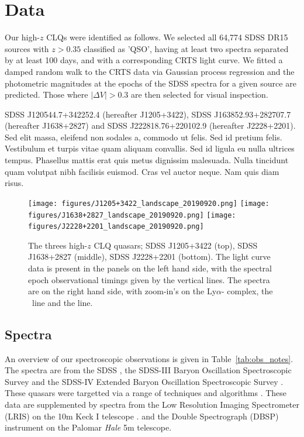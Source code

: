 \documentclass[a4paper,fleqn,usenatbib]{mnras}
\begin{document}
\section{Data}
Our high-$z$ CLQs were identified as follows. 
We selected all 64,774 SDSS DR15 sources with $z > 0.35$ classified as
'QSO', having at least two spectra separated by at least 100 days, and
with a corresponding CRTS light curve. We fitted a damped random walk
to the CRTS data via Gaussian process regression and the photometric
magnitudes at the epochs of the SDSS spectra for a given source are
predicted. Those where $|\Delta V| > 0.3$ are then selected for visual
inspection.

SDSS J120544.7+342252.4  (hereafter J1205+3422), 
SDSS J163852.93+282707.7 (hereafter J1638+2827) and
SDSS J222818.76+220102.9 (hereafter J2228+2201). 
Sed elit massa, eleifend non sodales a, commodo ut felis. Sed id
pretium felis. Vestibulum et turpis vitae quam aliquam convallis. Sed
id ligula eu nulla ultrices tempus. Phasellus mattis erat quis metus
dignissim malesuada. Nulla tincidunt quam volutpat nibh facilisis
euismod. Cras vel auctor neque. Nam quis diam risus.




\begin{figure}
  \centering
  \texttt{[image: figures/J1205+3422\_landscape\_20190920.png]}
  \texttt{[image: figures/J1638+2827\_landscape\_20190920.png]}
  \texttt{[image: figures/J2228+2201\_landscape\_20190920.png]}
  \vspace{-12pt}
  \caption[]{The threes high-$z$ CLQ quasars; 
    SDSS J1205+3422 (top), 
    SDSS J1638+2827 (middle), 
    SDSS J2228+2201 (bottom). 
The light curve data is present in the panels on the left hand side, with the 
spectral epoch observational timings given by the vertical lines. 
The spectra are on the right hand side, with zoom-in's on the Ly$\alpha$-\nv 
complex, the \civ\ line and the \mgii line. 
  }
  \label{fig:civ_clqs}
\end{figure}
\subsection{Spectra}
An overview of our spectroscopic observations is given in
Table~\ref{tab:obs_notes}.  The spectra are from the SDSS
\citep{Stoughton2002, DR7, Schneider2010}, the SDSS-III Baryon
Oscillation Spectroscopic Survey \citep[BOSS][]{Eisenstein2011,
Dawson2013, Smee2013, Alam2015, Paris2017} and the SDSS-IV Extended
Baryon Oscillation Spectroscopic Survey \citep[eBOSS; ][]{Dawson2016,
Abolfathi2018, Paris2018}.  These quasars were targetted via a range of
techniques and algorithms \citep[][]{Richards2002, Ross2012,
Myers2015}.  These data are supplemented by spectra from the Low
Resolution Imaging Spectrometer (LRIS) on the 10m Keck {\sc I}
telescope \citep{Oke1995}.  and the Double Spectrograph (DBSP)
instrument on the Palomar {\it Hale} 5m telescope.
\end{document}
